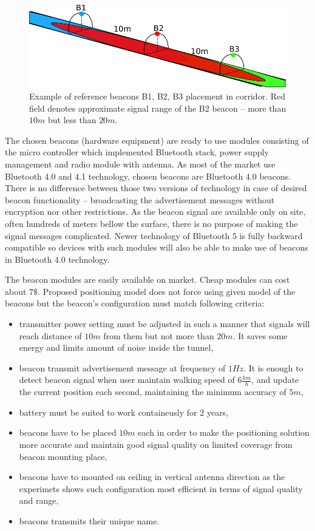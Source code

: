\documentclass[../main.tex]{subfiles}
\begin{document}
\begin{figure}[!htbp]
\includegraphics[width=\textwidth,clip]{pictures/beacons_placement.pdf}
\centering
\caption{Example of reference beacons B1, B2, B3 placement in corridor. Red field denotes approximate signal range of the B2 beacon -- more than $10m$ but less than $20m$.}
\label{fig:beacons_placement}
\end{figure}


The chosen beacons (hardware equipment) are ready to use modules consisting of the micro controller which implemented Bluetooth stack, power supply management and radio module with antenna. As most of the market use Bluetooth 4.0 and 4.1 technology, chosen beacons are Bluetooth 4.0 beacons. There is no difference between those two versions of technology in case of desired beacon functionality -- broadcasting the advertisement messages without encryption nor other restrictions. As the beacon signal are available only on site, often hundreds of meters bellow the surface, there is no purpose of making the signal messages complicated. Newer technology of Bluetooth 5 is fully backward compatible so devices with such modules will also be able to make use of beacons in Bluetooth 4.0 technology.

The beacon modules are easily available on market. Cheap modules can cost about $7\$$. Proposed positioning model does not force using given model of the beacons but the beacon's configuration must match following criteria:
\begin{itemize}
	\item transmitter power setting must be adjusted in such a manner that signals will reach distance of $10m$ from them but not more than $20m$. It saves some energy and limits amount of noise inside the tunnel,
	\item beacon transmit advertisement message at frequency of $1Hz$. It is enough to detect beacon signal when user maintain walking speed of $6\frac{km}{h}$, and update the current position each second, maintaining the minimum accuracy of $5m$,
	\item battery must be suited to work containeusly for 2 years,
	\item beacons have to be placed $10m$ each in order to make the positioning solution more accurate and maintain good signal quality on limited coverage from beacon mounting place,
	\item beacons have to mounted on ceiling in vertical antenna direction as the experimets shows such configuration most efficient in terms of signal quality and range,
	\item beacons transmits their unique name.
\end{itemize}
\end{document}
